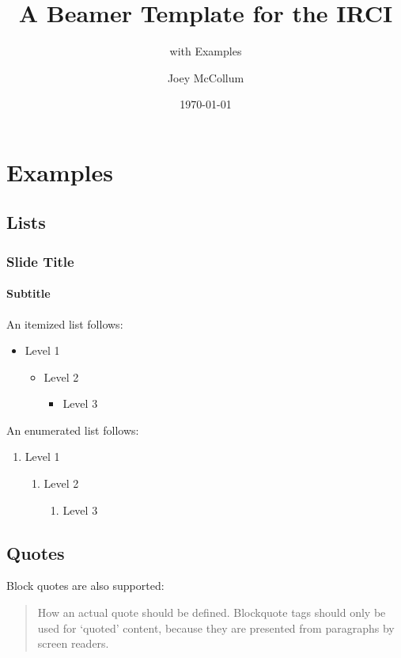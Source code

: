 \documentclass[11pt]{beamer}
\title{A Beamer Template for the IRCI}%
\subtitle{with Examples} %
\date{\today}%
\author{Joey McCollum}%
\institute{Institute for Religion and Critical Inquiry\\Australian Catholic University}%
\begin{document}
	\begin{frame}
		\titlepage
	\end{frame}
	\section{Examples}
	\sectionframe
	\subsection{Lists}
	\begin{frame}
		\frametitle{Slide Title}
		\framesubtitle{Subtitle}
		An itemized list follows:
		\begin{itemize}
			\item Level 1
			\begin{itemize}
				\item Level 2
				\begin{itemize}
					\item Level 3
				\end{itemize}
			\end{itemize}
		\end{itemize}
		\vspace{\baselineskip}

		An enumerated list follows:
		\begin{enumerate}
			\item Level 1
			\begin{enumerate}
				\item Level 2
				\begin{enumerate}
					\item Level 3
				\end{enumerate}
			\end{enumerate}
		\end{enumerate}
	\end{frame}
	\subsection{Quotes}
	\begin{frame}
		Block quotes are also supported:
		\begin{quote}
			How an actual quote should be defined. Blockquote tags should only be used for `quoted' content, because they are presented from paragraphs by screen readers.
		\end{quote}
	\end{frame}
\end{document}
